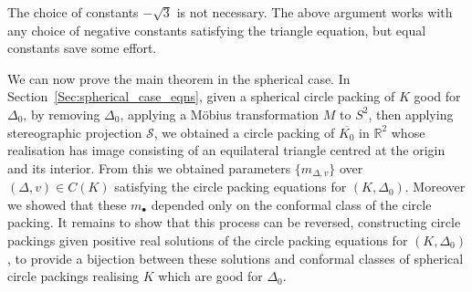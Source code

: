 \documentclass[12pt]{amsart}
\numberwithin{equation}{section}
\theoremstyle{named}
\newcommand{\refsec}[1]{Section~\ref{Sec:#1}}
\newcommand{\R}{\mathbb{R}}
\begin{document}
The choice of constants $-\sqrt{3}$ is not necessary. The above argument works with any choice of negative constants satisfying the triangle equation, but equal constants save some effort.

We can now prove the main theorem in the spherical case. 
In \refsec{spherical_case_eqns}, given a spherical circle packing of $K$ good for $\Delta_0$, by removing $\Delta_0$, applying a M\"{o}bius transformation $M$ to $S^2$, then applying stereographic projection $\mathcal{S}$, we obtained a circle packing of $\overline{K_0}$ 
in $\R^2$ whose realisation has image consisting of an equilateral triangle centred at the origin and its interior. From this we obtained parameters $\{m_{\Delta,v}\}$ over $(\Delta,v) \in C(K)$ satisfying the circle packing equations for $(K,\Delta_0)$. Moreover we showed that these $m_\bullet$ depended only on the conformal class of the circle packing. 
It remains to show that this process can be reversed, constructing circle packings given positive real solutions of the circle packing equations for $(K, \Delta_0)$, to provide a bijection between these solutions and conformal classes of spherical circle packings realising $K$ which are good for $\Delta_0$. 
\end{document}
